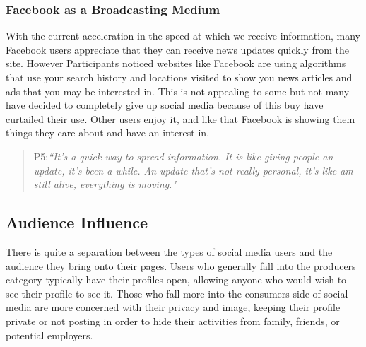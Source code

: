 \subsubsection{Facebook as a Broadcasting Medium}
With the current acceleration in the speed at which we receive information, many Facebook users appreciate that they can receive news updates quickly from the site. However Participants noticed websites like Facebook are using algorithms that use your search history and locations visited to show you news articles and ads that you may be interested in. This is not appealing to some but not many have decided to completely give up social media because of this buy have curtailed their use. Other users enjoy it, and like that Facebook is showing them things they care about and have an interest in.
\begin{quote}
P5:\textit{``It's a quick way to spread information. It is like giving people an update, it's been a while. An update that's not really personal, it's like am still alive, everything is moving."}
\end{quote}


\subsection{Audience Influence}
There is quite a separation between the types of social media users and the audience they bring onto their pages. Users who generally fall into the producers category typically have their profiles open, allowing anyone who would wish to see their profile to see it. Those who fall more into the consumers side of social media are more concerned with their privacy and image, keeping their profile private or not posting in order to hide their activities from family, friends, or potential employers.

